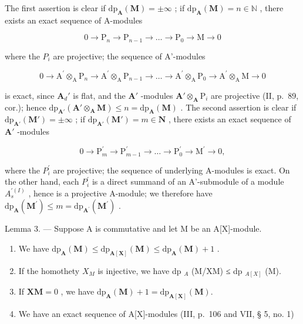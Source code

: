 The first assertion is clear if \(\mathrm{dp}_{\mathbf{A}}(\mathbf{M}) = \pm \infty\) ; if \(\mathrm{dp}_{\mathbf{A}}(\mathbf{M}) = n \in \mathbb{N}\) , there exists an exact sequence of A-modules

\[
0 \rightarrow \mathrm{P} _ {n} \rightarrow \mathrm{P} _ {n - 1} \rightarrow \dots \rightarrow \mathrm{P} _ {0} \rightarrow \mathrm{M} \rightarrow 0
\]

where the \(P_{i}\) are projective; the sequence of A'-modules

\[
0 \rightarrow \mathrm{A} ^ {\prime} \otimes_ {\mathrm{A}} \mathrm{P} _ {n} \rightarrow \mathrm{A} ^ {\prime} \otimes_ {\mathrm{A}} \mathrm{P} _ {n - 1} \rightarrow \dots \rightarrow \mathrm{A} ^ {\prime} \otimes_ {\mathrm{A}} \mathrm{P} _ {0} \rightarrow \mathrm{A} ^ {\prime} \otimes_ {\mathrm{A}} \mathrm{M} \rightarrow 0
\]

is exact, since \(\mathbf{A}_d'\) is flat, and the \(\mathbf{A}'\) -modules \(\mathbf{A}' \otimes_{\mathbf{A}} \mathrm{P}_i\) are projective (II, p.~89, cor.); hence \(\mathrm{dp}_{\mathbf{A}'}(\mathbf{A}' \otimes_{\mathbf{A}} \mathbf{M}) \leqslant n = \mathrm{dp}_{\mathbf{A}}(\mathbf{M})\) . The second assertion is clear if \(\mathrm{dp}_{\mathbf{A}'}(\mathbf{M}') = \pm \infty\) ; if \(\mathrm{dp}_{\mathbf{A}'}(\mathbf{M}') = m \in \mathbf{N}\) , there exists an exact sequence of \(\mathbf{A}'\) -modules

\[
0 \to \mathrm{P} _ {m} ^ {\prime} \to \mathrm{P} _ {m - 1} ^ {\prime} \to \dots \to \mathrm{P} _ {0} ^ {\prime} \to \mathrm{M} ^ {\prime} \to 0,
\]

where the \(P_{i}^{\prime}\) are projective; the sequence of underlying A-modules is exact. On the other hand, each \(P_{i}^{\prime}\) is a direct summand of an A'-submodule of a module \(A_{s}^{\prime(I)}\) , hence is a projective A-module; we therefore have \(\mathrm{dp}_{\mathbf{A}}(\mathbf{M}^{\prime}) \leqslant m = \mathrm{dp}_{\mathbf{A}^{\prime}}(\mathbf{M}^{\prime})\) .

Lemma 3. --- Suppose A is commutative and let M be an A{[}X{]}-module.

\begin{enumerate}
\def\labelenumi{\alph{enumi})}
\item
  We have \(\mathrm{dp}_{\mathbf{A}}(\mathbf{M}) \leqslant \mathrm{dp}_{\mathbf{A}[\mathbf{X}]}(\mathbf{M}) \leqslant \mathrm{dp}_{\mathbf{A}}(\mathbf{M}) + 1\) .
\item
  If the homothety \(X_{M}\) is injective, we have dp \(_{A}\) (M/XM) ≤ dp \(_{A[X]}\) (M).
\item
  If \(\mathbf{XM} = 0\) , we have \(\mathrm{dp}_{\mathbf{A}}(\mathbf{M}) + 1 = \mathrm{dp}_{\mathbf{A}[\mathbf{X}]}(\mathbf{M}).\)
\item
  We have an exact sequence of A{[}X{]}-modules (III, p.~106 and VII, § 5, no. 1)
\end{enumerate}

